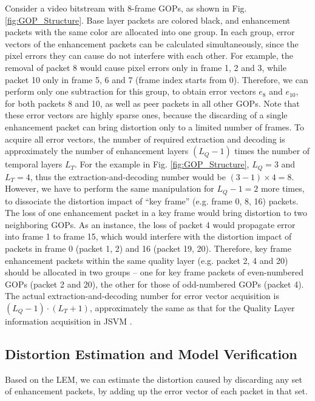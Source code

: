\documentclass[journal,draftclsnofoot,onecolumn]{IEEEtran}
\begin{document}
Consider a video bitstream with 8-frame GOPs, as shown in Fig. \ref{fig:GOP_Structure}. Base layer packets are colored black, and enhancement packets with the same color are allocated into one group. In each group, error vectors of the enhancement packets can be calculated simultaneously, since the pixel errors they can cause do not interfere with each other. For example, the removal of packet 8 would cause pixel errors only in frame 1, 2 and 3, while packet 10 only in frame 5, 6 and 7 (frame index starts from 0). Therefore, we can perform only one subtraction for this group, to obtain error vectors $e_{8}$ and $e_{10}$, for both packets 8 and 10, as well as peer packets in all other GOPs. Note that these error vectors are highly sparse ones, because the discarding of a single enhancement packet can bring distortion only to a limited number of frames. To acquire all error vectors, the number of required extraction and decoding is approximately the number of enhancement layers $(L_Q - 1)$ times the number of temporal layers $L_T$. For the example in Fig. \ref{fig:GOP_Structure}, $L_Q = 3$ and $L_T = 4$, thus the extraction-and-decoding number would be $(3 - 1) \times 4 = 8$. However, we have to perform the same manipulation for $L_Q - 1 = 2$ more times, to dissociate the distortion impact of ``key frame'' \cite{H264Overview} (e.g. frame 0, 8, 16) packets. The loss of one enhancement packet in a key frame would bring distortion to two neighboring GOPs. As an instance, the loss of packet 4 would propagate error into frame 1 to frame 15, which would interfere with the distortion impact of packets in frame 0 (packet 1, 2) and 16 (packet 19, 20). Therefore, key frame enhancement packets within the same quality layer (e.g. packet 2, 4 and 20) should be allocated in two groups -- one for key frame packets of even-numbered GOPs (packet 2 and 20), the other for those of odd-numbered GOPs (packet 4). The actual extraction-and-decoding number for error vector acquisition is $(L_Q - 1) \cdot (L_T + 1)$, approximately the same as that for the Quality Layer information acquisition in JSVM \cite{Amonou07}.
 
\subsection{Distortion Estimation and Model Verification}
\label{subsec:distortion-estimation}

Based on the LEM, we can estimate the distortion caused by discarding any set of enhancement packets, by adding up the error vector of each packet in that set.
\end{document}
